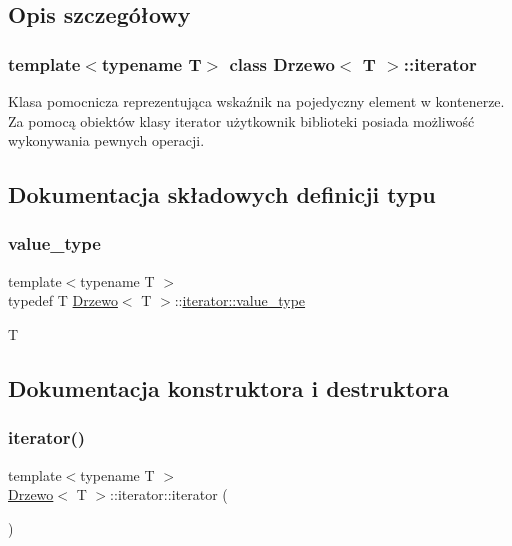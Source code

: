 \subsection{Opis szczegółowy}
\subsubsection*{template$<$typename T$>$\newline
class Drzewo$<$ T $>$\+::iterator}

Klasa pomocnicza reprezentująca wskaźnik na pojedyczny element w kontenerze. Za pomocą obiektów klasy iterator użytkownik biblioteki posiada możliwość wykonywania pewnych operacji. 

\subsection{Dokumentacja składowych definicji typu}
\mbox{\label{class_drzewo_1_1iterator_a7ba4387023d41aafa83791b42fc5b5ee}} 
\subsubsection{\texorpdfstring{value\+\_\+type}{value\_type}}
{\footnotesize\ttfamily template$<$typename T $>$ \\
typedef T \hyperlink{class_drzewo}{Drzewo}$<$ T $>$\+::\hyperlink{class_drzewo_1_1iterator_a7ba4387023d41aafa83791b42fc5b5ee}{iterator\+::value\+\_\+type}}

T 

\subsection{Dokumentacja konstruktora i destruktora}
\mbox{\label{class_drzewo_1_1iterator_a279751514e51594342daa7a7ed501a38}} 
\subsubsection{\texorpdfstring{iterator()}{iterator()}\hspace{0.1cm}{\footnotesize\ttfamily [1/2]}}
{\footnotesize\ttfamily template$<$typename T $>$ \\
\hyperlink{class_drzewo}{Drzewo}$<$ T $>$\+::iterator\+::iterator (\begin{DoxyParamCaption}{ }\end{DoxyParamCaption})\hspace{0.3cm}{\ttfamily [inline]}}

